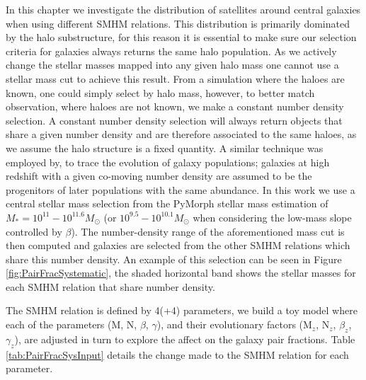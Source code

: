 In this chapter we investigate the distribution of satellites around central galaxies when using different SMHM relations. This distribution is primarily dominated by the halo substructure, for this reason it is essential to make sure our selection criteria for galaxies always returns the same halo population. As we actively change the stellar masses mapped into any given halo mass one cannot use a stellar mass cut to achieve this result. From a simulation where the haloes are known, one could simply select by halo mass, however, to better match observation, where haloes are not known, we make a constant number density selection. A constant number density selection will always return objects that share a given number density and are therefore associated to the same haloes, as we assume the halo structure is a fixed quantity. A similar technique was employed by, \citet[e.g.][]{Leja2013TRACINGSELECTION, Mundy2015Tracing3} to trace the evolution of galaxy populations; galaxies at high redshift with a given co-moving number density are assumed to be the progenitors of later populations with the same abundance. 
In this work we use a central stellar mass selection from the PyMorph stellar mass estimation of $M_{*} = 10^{11} - 10^{11.6} M_{\odot}$ (or $10^{9.5} - 10^{10.1} M_{\odot}$ when considering the low-mass slope controlled by $\beta$). The number-density range of the aforementioned mass cut is then computed and galaxies are selected from the other SMHM relations which share this number density.
An example of this selection can be seen in Figure \ref{fig:PairFracSystematic}, the shaded horizontal band shows the stellar masses for each SMHM relation that share number density.

The SMHM relation is defined by 4(+4) parameters, we build a toy model where each of the parameters (M, N, $\beta$, $\gamma$), and their evolutionary factors (M$_z$, N$_z$, $\beta_z$, $\gamma_z$), are adjusted in turn to explore the affect on the galaxy pair fractions. Table \ref{tab:PairFracSysInput} details the change made to the SMHM relation for each parameter. 

